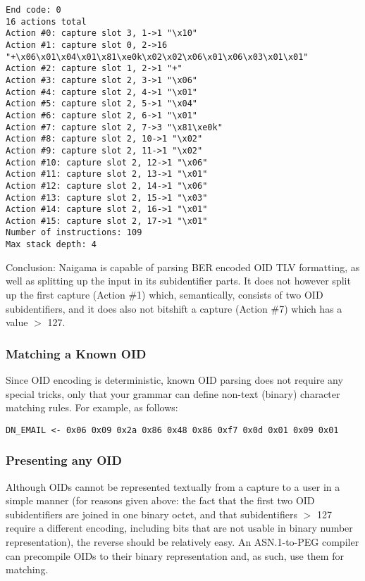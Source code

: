 \begin{changemargin}{-60mm}{0mm} 
\begin{myquote}
\begin{verbatim}
End code: 0
16 actions total
Action #0: capture slot 3, 1->1 "\x10"
Action #1: capture slot 0, 2->16 
"+\x06\x01\x04\x01\x81\xe0k\x02\x02\x06\x01\x06\x03\x01\x01"
Action #2: capture slot 1, 2->1 "+"
Action #3: capture slot 2, 3->1 "\x06"
Action #4: capture slot 2, 4->1 "\x01"
Action #5: capture slot 2, 5->1 "\x04"
Action #6: capture slot 2, 6->1 "\x01"
Action #7: capture slot 2, 7->3 "\x81\xe0k"
Action #8: capture slot 2, 10->1 "\x02"
Action #9: capture slot 2, 11->1 "\x02"
Action #10: capture slot 2, 12->1 "\x06"
Action #11: capture slot 2, 13->1 "\x01"
Action #12: capture slot 2, 14->1 "\x06"
Action #13: capture slot 2, 15->1 "\x03"
Action #14: capture slot 2, 16->1 "\x01"
Action #15: capture slot 2, 17->1 "\x01"
Number of instructions: 109
Max stack depth: 4
\end{verbatim}
\end{myquote}
\end{changemargin}

Conclusion: Naigama is capable of parsing BER encoded OID TLV formatting, 
as well as splitting up the input in its subidentifier parts. It does not 
however split up the first capture (Action \#1) which, semantically, 
consists of two OID subidentifiers, and it does also not bitshift a 
capture (Action \#7) which has a value $>$ 127.

\subsubsection{Matching a Known OID}
\label{sec:work:oids:known}

Since OID encoding is deterministic, known OID parsing does not require 
any special tricks, only that your grammar can define non-text (binary) 
character matching rules. For example, as follows:

\begin{changemargin}{-60mm}{0mm}
\begin{myquote}
\begin{verbatim}
DN_EMAIL <- 0x06 0x09 0x2a 0x86 0x48 0x86 0xf7 0x0d 0x01 0x09 0x01
\end{verbatim}
\end{myquote}
\end{changemargin}

\subsubsection{Presenting any OID}
Although OIDs cannot be represented textually from a capture to a user in 
a simple manner (for reasons given above: the fact that the first two OID 
subidentifiers are joined in one binary octet, and that subidentifiers $>$ 
127 require a different encoding, including bits that are not usable in 
binary number representation), the reverse should be relatively easy. An 
ASN.1-to-PEG compiler can precompile OIDs to their binary representation 
and, as such, use them for matching.

